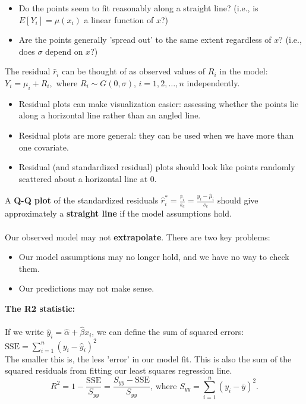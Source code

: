 \documentclass[a4paper,12pt]{article}
\begin{document}
\begin{itemize}
    \item Do the points seem to fit reasonably along a straight line? 
    (i.e., is \(E[Y_i] = \mu(x_i)\) a linear function of \(x\)?)
    \item Are the points generally 'spread out' to the same extent regardless of \(x\)? 
    (i.e., does \(\sigma\) depend on \(x\)?)
\end{itemize}
The residual \(\hat{r}_i\) can be thought of as observed values of \(R_i\) in the model:$
Y_i = \mu_i + R_i,$ where \(R_i \sim G(0, \sigma)\), \(i = 1, 2, \dots, n\) independently.
\begin{itemize}
    \item Residual plots can make visualization easier: assessing whether the points lie along a horizontal line rather than an angled line.
    \item Residual plots are more general: they can be used when we have more than one covariate.
    \item Residual (and standardized residual) plots should look like points randomly scattered about a horizontal line at 0.
\end{itemize}
A \textbf{Q-Q plot} of the standardized residuals 
$\hat{r}^*_i = \frac{\hat{r}_i}{s_e} = \frac{y_i - \hat{\mu}_i}{s_e}$
should give approximately a \textbf{straight line} if the model assumptions hold.
\\
\\Our observed model may not \textbf{extrapolate}. There are two key problems:

\begin{itemize}
    \item Our model assumptions may no longer hold, and we have no way to check them.
    \item Our predictions may not make sense.
\end{itemize}\bigskip
\textbf{The R2 statistic:}
\\
\\If we write $\hat{y}_i = \hat{\alpha} + \hat{\beta}x_i$, we can define the sum of squared errors:
\(
\text{SSE} = \sum_{i=1}^n (y_i - \hat{y}_i)^2
\)
\\The smaller this is, the less 'error' in our model fit. This is also the sum of the squared residuals from fitting our least squares regression line. 
\[
R^2 = 1 - \frac{\text{SSE}}{S_{yy}} = \frac{S_{yy} - \text{SSE}}{S_{yy}} \text{, where } S_{yy} = \sum_{i=1}^n (y_i - \bar{y})^2.
\]
\end{document}
